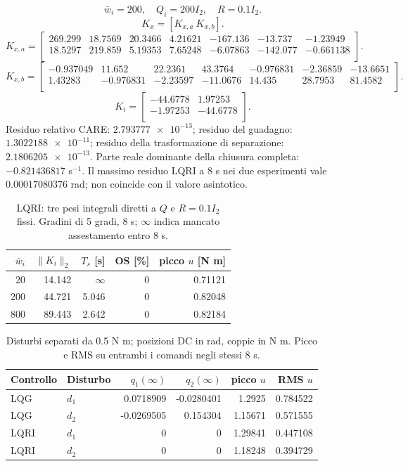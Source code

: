 \[\bar w_i=200,\quad Q_i=200 I_2,\quad R=0.1 I_2.\]
\[K_x=[K_{x,a}\ K_{x,b}].\]
{\small
\[K_{x,a}=\begin{bmatrix}
269.299 & 18.7569 & 20.3466 & 4.21621 & -167.136 & -13.737 & -1.23949 \\
18.5297 & 219.859 & 5.19353 & 7.65248 & -6.07863 & -142.077 & -0.661138 \\
\end{bmatrix}.\]
\[K_{x,b}=\begin{bmatrix}
-0.937049 & 11.652 & 22.2361 & 43.3764 & -0.976831 & -2.36859 & -13.6651 \\
1.43283 & -0.976831 & -2.23597 & -11.0676 & 14.435 & 28.7953 & 81.4582 \\
\end{bmatrix}.\]
\[K_i=\begin{bmatrix}
-44.6778 & 1.97253 \\
-1.97253 & -44.6778 \\
\end{bmatrix}.\]
}
Residuo relativo CARE: $\num{2.793777e-13}$; residuo del guadagno: $\num{1.3022188e-11}$; residuo della trasformazione di separazione: $\num{2.1806205e-13}$.
Parte reale dominante della chiusura completa: $\num{-0.821436817}$ s$^{-1}$.
Il massimo residuo LQRI a 8 s nei due esperimenti vale $\num{0.00017080376}$ rad; non coincide con il valore asintotico.\par
\begin{table}[htbp]\centering\small
\begin{tabular}{rrrrr}\toprule
$\bar w_i$ & $\|K_i\|_2$ & $T_s$ [s] & OS [\%] & picco $u$ [N m] \\
\midrule
20 & 14.142 & $\infty$ & 0 & 0.71121 \\
200 & 44.721 & 5.046 & 0 & 0.82048 \\
800 & 89.443 & 2.642 & 0 & 0.82184 \\
\bottomrule\end{tabular}\caption{LQRI: tre pesi integrali diretti a $Q$ e $R=0.1 I_2$ fissi. Gradini di 5 gradi, 8 s; $\infty$ indica mancato assestamento entro 8 s.}\label{tab:lqri-wi}\end{table}
\begin{table}[htbp]\centering\small
\begin{tabular}{llrrrr}\toprule
Controllo & Disturbo & $q_1(\infty)$ & $q_2(\infty)$ & picco $u$ & RMS $u$ \\
\midrule
LQG & $d_1$ & 0.0718909 & -0.0280401 & 1.2925 & 0.784522 \\
LQG & $d_2$ & -0.0269505 & 0.154304 & 1.15671 & 0.571555 \\
LQRI & $d_1$ & 0 & 0 & 1.29841 & 0.447108 \\
LQRI & $d_2$ & 0 & 0 & 1.18248 & 0.394729 \\
\bottomrule\end{tabular}\caption{Disturbi separati da 0.5 N m; posizioni DC in rad, coppie in N m. Picco e RMS su entrambi i comandi negli stessi 8 s.}\label{tab:lqri-disturbi}\end{table}
